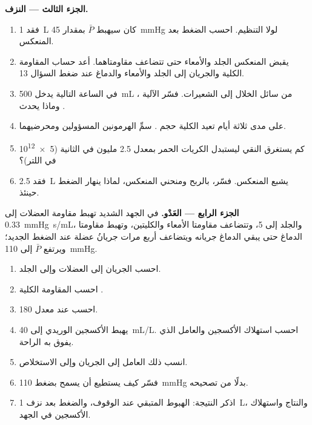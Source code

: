 \begin{problem}
\medskip
\noindent\textbf{الجزء الثالث --- النزف.}
\begin{enumerate}[resume]
  \item فقد \qty{1}{L} كان سيهبط $\bar P$ بمقدار
        \qty{45}{mmHg} لولا التنظيم. احسب الضغط بعد المنعكس.
  \item يقبض المنعكس  الجلد والأمعاء حتى
        تتضاعف مقاومتاهما. أعد حساب المقاومة الكلية
        والجريان إلى الجلد والأمعاء والدماغ عند ضغط
        السؤال 13.
  \item في الساعة التالية يدخل \qty{500}{mL} من سائل الخلال
        إلى الشعيرات. فسّر الآلية ،
        وماذا يحدث .
  \item على مدى ثلاثة أيام تعيد الكلية حجم .
        سمِّ الهرمونين المسؤولين ومحرضيهما.
  \item كم يستغرق النقي ليستبدل الكريات الحمر بمعدل
        \num{2.5} مليون في الثانية (\num{5e12} في اللتر)؟
  \item فقد \qty{2.5}{L} يشبع المنعكس. فسّر، بالربح
        ومنحني المنعكس، لماذا ينهار الضغط حينئذ.
\end{enumerate}

\medskip
\noindent\textbf{الجزء الرابع --- العَدْو.}
في الجهد الشديد تهبط مقاومة العضلات إلى \qty{0.33}{mmHg.s/mL}،
والجلد إلى 5، وتتضاعف مقاومتا الأمعاء والكليتين، وتهبط مقاومتا
الدماغ  حتى يبقي الدماغ جريانه ويتضاعف أربع مرات
جريانُ عضلة  عند الضغط الجديد؛ ويرتفع $\bar P$ إلى \qty{110}{mmHg}.
\begin{enumerate}[resume]
  \item احسب الجريان إلى العضلات وإلى الجلد.
  \item احسب المقاومة الكلية .
  \item احسب  عند معدل 180.
  \item يهبط الأكسجين الوريدي إلى \qty{40}{mL/L}. احسب استهلاك
        الأكسجين والعامل الذي يفوق به الراحة.
  \item انسب ذلك العامل إلى الجريان وإلى الاستخلاص.
  \item فسّر كيف يستطيع  أن يسمح بضغط
        \qty{110}{mmHg} بدلًا من تصحيحه.
  \item اذكر النتيجة: الهبوط المتبقي عند الوقوف،
        والضغط بعد نزف \qty{1}{L}، والنتاج
        واستهلاك الأكسجين في الجهد.
\end{enumerate}
\end{problem}
